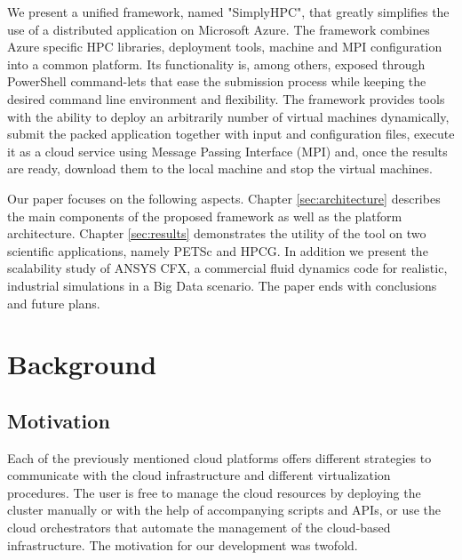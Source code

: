 \documentclass[3p,times]{elsarticle}
\begin{document}
We present a unified framework, named "SimplyHPC",  that greatly simplifies the use of a distributed application on Microsoft Azure. The framework combines Azure specific HPC libraries, deployment tools, machine and MPI configuration into a common platform. Its functionality is, among others, exposed through PowerShell command-lets that ease the submission process while keeping the desired command line environment and flexibility. The framework provides tools with the ability to deploy an arbitrarily number of virtual machines dynamically, submit the packed application together with input and configuration files, execute it as a cloud service using Message Passing Interface (MPI) and, once the results are ready, download them to the local machine and stop the virtual machines. 

Our paper focuses on the following aspects. Chapter \ref{sec:architecture} describes the main components of the proposed framework as well as the platform architecture. Chapter \ref{sec:results} demonstrates the utility of the tool on two scientific applications, namely PETSc and HPCG. In addition we present the scalability study of ANSYS CFX, a commercial fluid dynamics code for realistic, industrial simulations in a Big Data scenario. The paper ends with conclusions and future plans.




\section{Background}
\label{sec:background}
\subsection{Motivation}

Each of the previously mentioned cloud platforms offers different strategies to communicate with the cloud infrastructure and different virtualization procedures. The user is free to manage the cloud resources by deploying the cluster manually or with the help of accompanying scripts and APIs, or use the cloud orchestrators that automate the management of the cloud-based infrastructure. The motivation for our development was twofold.
\end{document}
